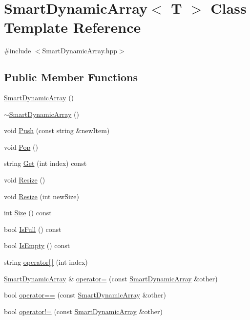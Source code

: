 \hypertarget{classSmartDynamicArray}{}\section{Smart\+Dynamic\+Array$<$ T $>$ Class Template Reference}
\label{classSmartDynamicArray}


{\ttfamily \#include $<$Smart\+Dynamic\+Array.\+hpp$>$}

\subsection*{Public Member Functions}
\begin{DoxyCompactItemize}
\item 
\hyperlink{classSmartDynamicArray_a0d72987244de8430d00a79a90e62c870}{Smart\+Dynamic\+Array} ()
\item 
\hyperlink{classSmartDynamicArray_af5e45116a460a84181a4672d7ffe1c17}{$\sim$\+Smart\+Dynamic\+Array} ()
\item 
void \hyperlink{classSmartDynamicArray_a9d69a8736ff3b35dde79883cde0a1ac7}{Push} (const string \&new\+Item)
\item 
void \hyperlink{classSmartDynamicArray_a692947b7e142df4d668ee4f36054323d}{Pop} ()
\item 
string \hyperlink{classSmartDynamicArray_ae8091301e4b5544dfaeeb4e0100882ec}{Get} (int index) const 
\item 
void \hyperlink{classSmartDynamicArray_aacf939cf6279e03a213ed691b8a6aa5d}{Resize} ()
\item 
void \hyperlink{classSmartDynamicArray_a1bfa64ae55ca6f156e2a5a2263243c0d}{Resize} (int new\+Size)
\item 
int \hyperlink{classSmartDynamicArray_a67711ddeea4b0b86bd976359ca323114}{Size} () const 
\item 
bool \hyperlink{classSmartDynamicArray_a7ba080a321b6b821b6a4fc439f00da79}{Is\+Full} () const 
\item 
bool \hyperlink{classSmartDynamicArray_a55d1b117544593dcbbd98ae37dfd9141}{Is\+Empty} () const 
\item 
string \hyperlink{classSmartDynamicArray_a69370eb1ced09b716ec2f24809a5f795}{operator\mbox{[}$\,$\mbox{]}} (int index)
\item 
\hyperlink{classSmartDynamicArray}{Smart\+Dynamic\+Array} \& \hyperlink{classSmartDynamicArray_ad7f55bcfbd7121f540d4b7540bd7bcb3}{operator=} (const \hyperlink{classSmartDynamicArray}{Smart\+Dynamic\+Array} \&other)
\item 
bool \hyperlink{classSmartDynamicArray_a1b0a308ff5b6f4dcf4befcad78bbd919}{operator==} (const \hyperlink{classSmartDynamicArray}{Smart\+Dynamic\+Array} \&other)
\item 
bool \hyperlink{classSmartDynamicArray_ac0c6613cdf637eac9ecff5f12cbd264e}{operator!=} (const \hyperlink{classSmartDynamicArray}{Smart\+Dynamic\+Array} \&other)
\end{DoxyCompactItemize}
